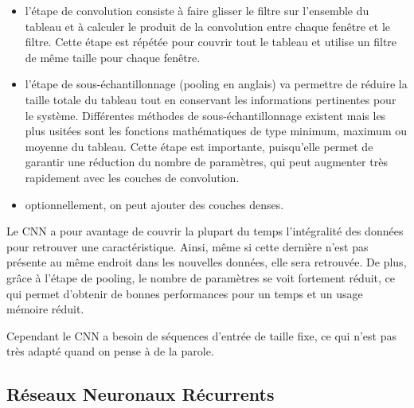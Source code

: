\begin{itemize}
  \item l'étape de convolution consiste à faire glisser le filtre sur l'ensemble du tableau et à calculer le produit de la convolution entre chaque fenêtre et le filtre. Cette étape est répétée pour couvrir tout le tableau et utilise un filtre de même taille pour chaque fenêtre.
  \item l'étape de sous-échantillonnage (pooling en anglais) va permettre de réduire la taille totale du tableau tout en conservant les informations pertinentes pour le système. Différentes méthodes de sous-échantillonnage existent mais les plus usitées sont les fonctions mathématiques de type minimum, maximum ou moyenne du tableau. Cette étape est importante, puisqu'elle permet de garantir une réduction du nombre de paramètres, qui peut augmenter très rapidement avec les couches de convolution.
  \item optionnellement, on peut ajouter des couches denses.%
\end{itemize}


Le CNN a pour avantage de couvrir la plupart du temps l'intégralité des données pour retrouver une caractéristique. Ainsi, même si cette dernière n'est pas présente au même endroit dans les nouvelles données, elle sera retrouvée. De plus, grâce à l'étape de pooling, le nombre de paramètres se voit fortement réduit, ce qui permet d'obtenir de bonnes performances pour un temps et un usage mémoire réduit.

Cependant le CNN %
a besoin de séquences d'entrée de taille fixe, ce qui n'est pas très adapté quand on pense à de la parole.

\subsection{Réseaux Neuronaux Récurrents}


